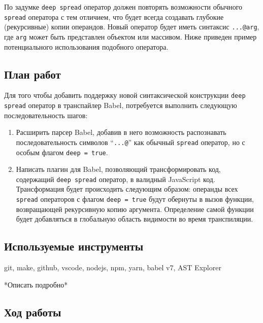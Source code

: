\documentclass[14pt, a4paper]{article}
\def\code#1{\texttt{#1}} %
\begin{document}
По задумке \code{deep spread} оператор должен повторять возможности обычного \code{spread} оператора с тем отличием,
что будет всегда создавать глубокие (рекурсивные) копии операндов. Новый оператор будет иметь синтаксис \code{...@arg},
где \code{arg} может быть представлен объектом или массивом. Ниже приведен пример потенциального 
использования подобного оператора.


\subsection{План работ}
Для того чтобы добавить поддержку новой синтаксической конструкции \code{deep spread} оператор в 
транспайлер Babel, потребуется выполнить следующую последовательность шагов:
\begin{enumerate}
  \item Расширить парсер Babel, добавив в него возможность распознавать последовательность символов 
    ``\code{...@}'' как обычный \code{spread} оператор, но с особым флагом \code{deep = true}. 
  \item Написать плагин для Babel, позволяющий трансформировать код, содержащий \code{deep spread} оператор,
  в валидный JavaScript код. Трансформация будет происходить следующим образом: операнды всех \code{spread} операторов
  с флагом \code{deep = true} будут обернуты в вызов функции, возвращающей рекурсивную копию аргумента.
  Определение самой функции будет добавляться в глобальную область видимости во время транспиляции. 
\end{enumerate}

\subsection{Используемые инструменты}
git, make, github, vscode, nodejs, npm, yarn, babel v7, AST Explorer

*Описать подробно*
\subsection{Ход работы}
\end{document}
